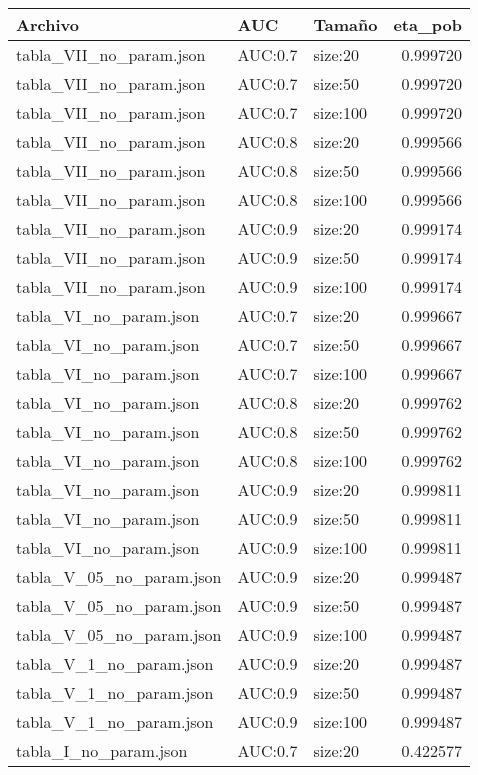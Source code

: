 \begin{tabular}{lllr}
\toprule
Archivo & AUC & Tamaño & eta_pob \\
\midrule
tabla_VII_no_param.json & AUC:0.7 & size:20 & 0.999720 \\
tabla_VII_no_param.json & AUC:0.7 & size:50 & 0.999720 \\
tabla_VII_no_param.json & AUC:0.7 & size:100 & 0.999720 \\
tabla_VII_no_param.json & AUC:0.8 & size:20 & 0.999566 \\
tabla_VII_no_param.json & AUC:0.8 & size:50 & 0.999566 \\
tabla_VII_no_param.json & AUC:0.8 & size:100 & 0.999566 \\
tabla_VII_no_param.json & AUC:0.9 & size:20 & 0.999174 \\
tabla_VII_no_param.json & AUC:0.9 & size:50 & 0.999174 \\
tabla_VII_no_param.json & AUC:0.9 & size:100 & 0.999174 \\
tabla_VI_no_param.json & AUC:0.7 & size:20 & 0.999667 \\
tabla_VI_no_param.json & AUC:0.7 & size:50 & 0.999667 \\
tabla_VI_no_param.json & AUC:0.7 & size:100 & 0.999667 \\
tabla_VI_no_param.json & AUC:0.8 & size:20 & 0.999762 \\
tabla_VI_no_param.json & AUC:0.8 & size:50 & 0.999762 \\
tabla_VI_no_param.json & AUC:0.8 & size:100 & 0.999762 \\
tabla_VI_no_param.json & AUC:0.9 & size:20 & 0.999811 \\
tabla_VI_no_param.json & AUC:0.9 & size:50 & 0.999811 \\
tabla_VI_no_param.json & AUC:0.9 & size:100 & 0.999811 \\
tabla_V_05_no_param.json & AUC:0.9 & size:20 & 0.999487 \\
tabla_V_05_no_param.json & AUC:0.9 & size:50 & 0.999487 \\
tabla_V_05_no_param.json & AUC:0.9 & size:100 & 0.999487 \\
tabla_V_1_no_param.json & AUC:0.9 & size:20 & 0.999487 \\
tabla_V_1_no_param.json & AUC:0.9 & size:50 & 0.999487 \\
tabla_V_1_no_param.json & AUC:0.9 & size:100 & 0.999487 \\
tabla_I_no_param.json & AUC:0.7 & size:20 & 0.422577 \\

\end{tabular}
